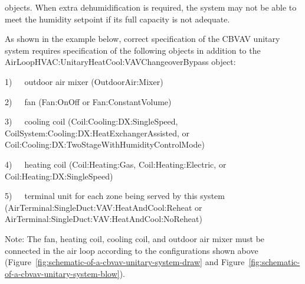 objects. When extra dehumidification is required, the system may not be able to meet the humidity setpoint if its full capacity is not adequate.

As shown in the example below, correct specification of the CBVAV unitary system requires specification of the following objects in addition to the AirLoopHVAC:UnitaryHeatCool:VAVChangeoverBypass object:

1)~~~outdoor air mixer (OutdoorAir:Mixer)

2)~~~fan (Fan:OnOff or Fan:ConstantVolume)

3)~~~cooling coil (Coil:Cooling:DX:SingleSpeed, CoilSystem:Cooling:DX:HeatExchangerAssisted, or Coil:Cooling:DX:TwoStageWithHumidityControlMode)

4)~~~heating coil (Coil:Heating:Gas, Coil:Heating:Electric, or Coil:Heating:DX:SingleSpeed)

5)~~~terminal unit for each zone being served by this system (AirTerminal:SingleDuct:VAV:HeatAndCool:Reheat or AirTerminal:SingleDuct:VAV:HeatAndCool:NoReheat)

Note: The fan, heating coil, cooling coil, and outdoor air mixer must be connected in the air loop according to the configurations shown above (Figure~\ref{fig:schematic-of-a-cbvav-unitary-system-draw} and Figure~\ref{fig:schematic-of-a-cbvav-unitary-system-blow}).

